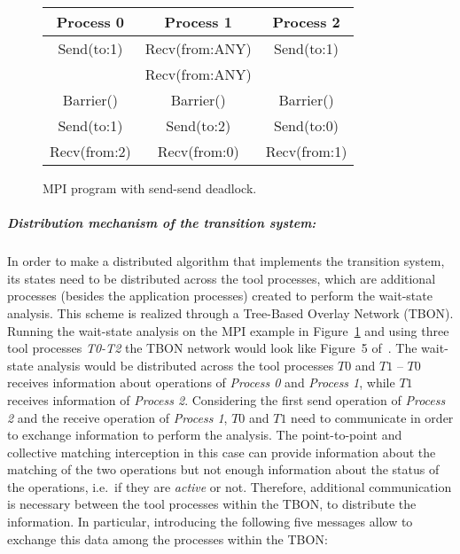 \begin{refsection}
\begin{figure}
  \centering
  \begin{tabular}{c | c | c}
    Process 0 & Process 1 & Process 2 \\
    \hline
    Send(to:1) & Recv(from:ANY) & Send(to:1) \\
              & Recv(from:ANY) & \\
    Barrier() & Barrier() & Barrier() \\
    Send(to:1) & Send(to:2) & Send(to:0) \\
    Recv(from:2) & Recv(from:0) & Recv(from:1)
  \end{tabular}
  \caption{MPI program with send-send deadlock.}
  \label{fig:mpi_ex1}
\end{figure}

\subparagraph{Distribution mechanism of the transition system:} In order to
make a distributed algorithm that implements the transition system, its states
need to be distributed across the tool processes, which are additional
processes (besides the application processes) created to perform the
wait-state analysis.
%
This scheme is realized through a Tree-Based Overlay Network (TBON).
%
Running the wait-state analysis on the MPI example in Figure~\ref{fig:mpi_ex1}
and using three tool processes \emph{T0-T2} the TBON network would look like
Figure~5 of~\cite{Hilbrich:2013:DWS:2503210.2503237}.
%
The wait-state analysis would be distributed across the tool processes $T0$
and $T1$ -- $T0$ receives information about operations of \emph{Process 0} and
\emph{Process 1}, while $T1$ receives information of \emph{Process 2}.
%
Considering the first send operation of \emph{Process 2} and the receive
operation of \emph{Process 1}, $T0$ and $T1$ need to communicate in order to
exchange information to perform the analysis.
%
The point-to-point and collective matching interception in this case can
provide information about the matching of the two operations but not enough
information about the status of the operations, i.e.\ if they are
\emph{active} or not.
%
Therefore, additional communication is necessary between the tool processes
within the TBON, to distribute the information.
%
In particular, introducing the following five messages allow to exchange this
data among the processes within the TBON:


\end{refsection}
